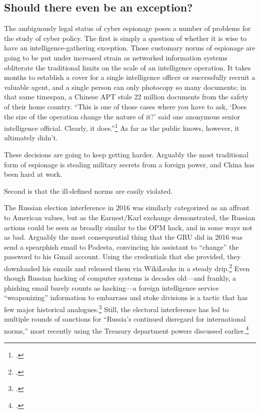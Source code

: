 \documentclass{memoir}
\begin{document}
\begin{refsegment}
\subsection{Should there even be an exception?}
The ambiguously legal status of cyber espionage poses a number of problems for the study of cyber policy. The first is simply a question of whether it is wise to have an intelligence-gathering exception. Those customary norms of espionage are going to be put under increased strain as networked information systems obliterate the traditional limits on the scale of an intelligence operation. It takes months to establish a cover for a single intelligence officer or successfully recruit a valuable agent, and a single person can only photocopy so many documents; in that same timespan, a Chinese APT stole 22 million documents from the safety of their home country. ``This is one of those cases where you have to ask, `Does the size of the operation change the nature of it?' said one anonymous senior intelligence official. Clearly, it does.''\footcite{sanger_u.s._2015} As far as the public knows, however, it ultimately didn't.

These decisions are going to keep getting harder. Arguably the most traditional form of espionage is stealing military secrets from a foreign power, and China has been hard at work.

Second is that the ill-defined norms are easily violated.

The Russian election interference in 2016 was similarly categorized as an affront to American values, but as the Earnest/Karl exchange demonstrated, the Russian actions could be seen as broadly similar to the OPM hack, and in some ways not as bad. Arguably the most consequential thing that the GRU did in 2016 was send a spearphish email to Podesta, convincing his assistant to ``change'' the password to his Gmail account. Using the credentials that she provided, they downloaded his emails and released them via WikiLeaks in a steady drip.\footcite{nakashima_how_2018} Even though Russian hacking of computer systems is decades old---and frankly, a phishing email barely counts as hacking---a foreign intelligence service ``weaponizing'' information to embarrass and stoke divisions is a tactic that has few major historical analogues.\footcite{nakashima_how_2018} Still, the electoral interference has led to multiple rounds of sanctions for ``Russia’s continued disregard for international norms,'' most recently using the Treasury department powers discussed earlier.\footcite{department_of_the_treasury_treasury_2018}



\end{refsegment}
\end{document}
